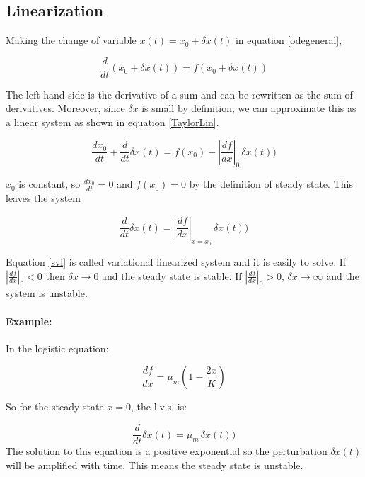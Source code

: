 \documentclass{tufte-book} %
\begin{document}
\subsection{Linearization}

Making the change of variable $x(t) = x_0 + \delta x(t)$ in equation \ref{odegeneral},

\begin{equation}
	\frac{d}{dt} \left( x_0 + \delta x(t) \right) = f(x_0 + \delta x(t)) \nonumber
\end{equation}

The left hand side is the  derivative of a sum and can be rewritten as the sum of derivatives. Moreover, since $\delta x$ is small by definition, we can approximate this as a linear system as shown in equation \ref{TaylorLin}.

\begin{equation}
	 \frac{dx_0}{dt} + \frac{d}{dt}\delta x(t)  = f(x_0) +\left|\frac{df}{dx}\right|_0 \, \delta x(t)) \nonumber
\end{equation}

$x_0$ is constant, so $\frac{dx_0}{dt}=0$ and $f(x_0)=0$ by the definition of steady state. This leaves the system 

\begin{equation}
	\label{svl}
	\frac{d}{dt}\delta x(t)  =  \left|\frac{df}{dx}\right|_{x=x_0} \,  \delta x(t)) 
\end{equation}

Equation \ref{svl} is called variational linearized system and it is easily to solve. If $\left|\frac{df}{dx}\right|_0 < 0$ then $\delta x \rightarrow 0$ and the steady state is stable. If $\left|\frac{df}{dx}\right|_0 > 0$, $\delta x \rightarrow \infty$ and the system is unstable.

\paragraph{Example:} In the logistic equation:

\begin{equation}
\frac{df}{dx} = \mu_{m} \left( 1-\frac{2 x}{K}\right) \nonumber
\end{equation}

 So for the steady state $x=0$, the l.v.s. is:
 
 \begin{equation}
 	\frac{d}{dt}\delta x(t)  = \mu_m \,  \delta x(t))  \nonumber
 \end{equation}
The solution to this equation is a positive exponential so the perturbation $\delta x(t)$ will be amplified with time. This means the steady state is unstable.
\end{document}
